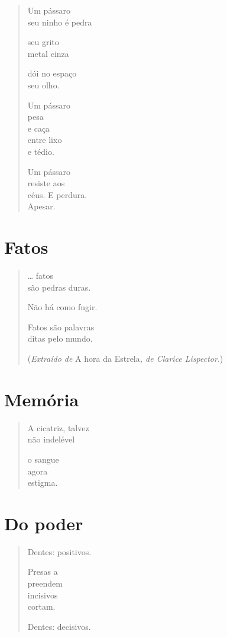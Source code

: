 \begin{verse}
Um pássaro\\
seu ninho é pedra

seu grito\\
metal cinza

dói no espaço\\
seu olho.

Um pássaro\\
pesa\\
e caça\\
entre lixo\\
e tédio.

Um pássaro\\
resiste aos\\
céus. E perdura.\\
Apesar.
\end{verse}

\chapter{Fatos}

\begin{verse}
\ldots{} fatos\\
são pedras duras.

Não há como fugir.

Fatos são palavras\\
ditas pelo mundo.

(\emph{Extraído de} A hora da Estrela\emph{, de Clarice Lispector}.)
\end{verse}

\chapter{Memória}

\begin{verse}
A cicatriz, talvez\\
não indelével

o sangue\\
agora\\
estigma.
\end{verse}

\chapter{Do poder}

\begin{verse}
Dentes: positivos.

Presas a\\
preendem\\
incisivos\\
cortam.

Dentes: decisivos.
\end{verse}

